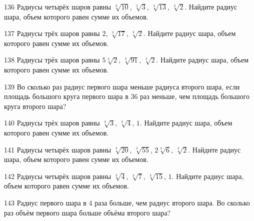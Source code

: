 \documentclass[a4paper]{article}
\begin{document}
\begin{taskBN}{136}
Радиусы четырёх шаров равны $\sqrt[3]{10}$, $\sqrt[3]{3}$, $\sqrt[3]{13}$, $\sqrt[3]{2}$. Найдите радиус шара, объем которого равен сумме их объемов.
\end{taskBN}

\begin{taskBN}{137}
Радиусы трёх шаров равны $2$, $\sqrt[3]{17}$, $\sqrt[3]{2}$. Найдите радиус шара, объем которого равен сумме их объемов.
\end{taskBN}

\begin{taskBN}{138}
Радиусы трёх шаров равны $5\sqrt[3]{2}$, $\sqrt[3]{91}$, $\sqrt[3]{2}$. Найдите радиус шара, объем которого равен сумме их объемов.
\end{taskBN}

\begin{taskBN}{139}
Во сколько раз радиус первого шара меньше радиуса второго шара, если площадь большого круга первого шара в 36 раз меньше, чем площадь большого круга второго шара?
\end{taskBN}

\begin{taskBN}{140}
Радиусы трёх шаров равны $\sqrt[3]{3}$, $\sqrt[3]{4}$, $1$. Найдите радиус шара, объем которого равен сумме их объемов.
\end{taskBN}

\begin{taskBN}{141}
Радиусы четырёх шаров равны $\sqrt[3]{20}$, $\sqrt[3]{55}$, $2\sqrt[3]{6}$, $\sqrt[3]{2}$. Найдите радиус шара, объем которого равен сумме их объемов.
\end{taskBN}

\begin{taskBN}{142}
Радиусы четырёх шаров равны $\sqrt[3]{4}$, $\sqrt[3]{7}$, $\sqrt[3]{15}$, $1$. Найдите радиус шара, объем которого равен сумме их объемов.
\end{taskBN}

\begin{taskBN}{143}
Радиус первого шара в 4 раза больше, чем радиус второго шара. Во сколько раз объём первого шара больше объёма второго шара?
\end{taskBN}
\end{document}
